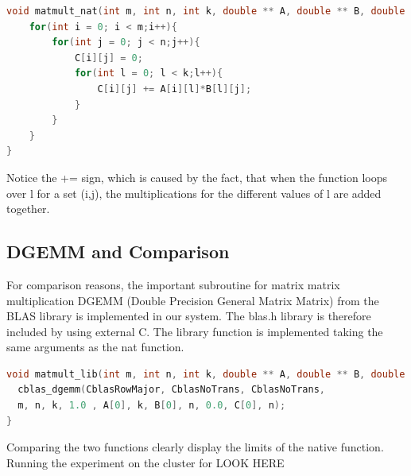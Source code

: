 \begin{lstlisting}[language=C++, caption=Function Prototype]
void matmult_nat(int m, int n, int k, double ** A, double ** B, double ** C){
	for(int i = 0; i < m;i++){
		for(int j = 0; j < n;j++){
			C[i][j] = 0;
			for(int l = 0; l < k;l++){
				C[i][j] += A[i][l]*B[l][j];
			}
		}
	}
}
\end{lstlisting}

Notice the += sign, which is caused by the fact, that when the function loops over l for a set (i,j), the multiplications for the different values of l are added together.


\subsection{DGEMM and Comparison}

For comparison reasons, the important subroutine for matrix matrix multiplication DGEMM (Double Precision General Matrix Matrix) from the BLAS library is implemented in our system. The blas.h library is therefore included by using external C. The library function is implemented taking the same arguments as the nat function.

\begin{lstlisting}[language=C++, caption=lib]
void matmult_lib(int m, int n, int k, double ** A, double ** B, double ** C){
  cblas_dgemm(CblasRowMajor, CblasNoTrans, CblasNoTrans, 
  m, n, k, 1.0 , A[0], k, B[0], n, 0.0, C[0], n);
}
\end{lstlisting}

Comparing the two functions clearly display the limits of the native function. Running the experiment on the cluster for LOOK HERE



